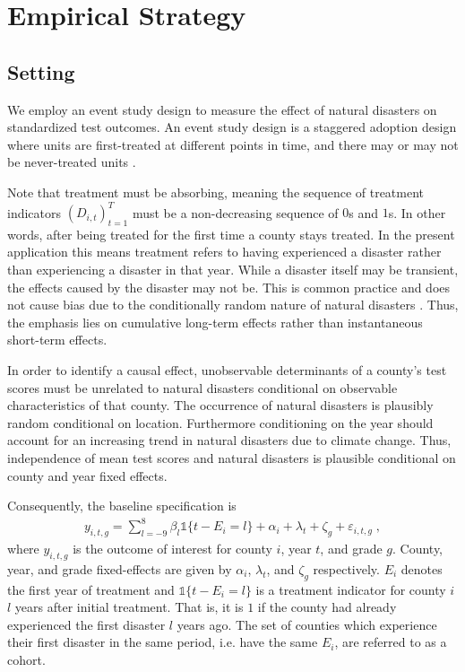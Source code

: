 
\section{Empirical Strategy} \label{EmpStrat}

\subsection{Setting}

We employ an event study design to measure the effect of natural disasters on standardized test outcomes. An event study design is a staggered adoption design where units are first-treated at different points in time, and there may or may not be never-treated units \citep{Sun_2021}.

Note that treatment must be absorbing, meaning the sequence of treatment indicators $(D_{i, t})_{t=1}^T$ must be a non-decreasing sequence of $0$s and $1$s. In other words, after being treated for the first time a county stays treated. In the present application this means treatment refers to having experienced a disaster rather than experiencing a disaster in that year. While a disaster itself may be transient, the effects caused by the disaster may not be. This is common practice and does not cause bias due to the conditionally random nature of natural disasters \citep{Deryugina_2017}. Thus, the emphasis lies on cumulative long-term effects rather than instantaneous short-term effects.

In order to identify a causal effect, unobservable determinants of a county's test scores must be unrelated to natural disasters conditional on observable characteristics of that county. The occurrence of natural disasters is plausibly random conditional on location. Furthermore conditioning on the year should account for an increasing trend in natural disasters due to climate change. Thus, independence of mean test scores and natural disasters is plausible conditional on county and year fixed effects.

Consequently, the baseline specification is
\begin{align} \label{baseline}
	y_{i, t, g} = \sum_{l = -9}^{8} \beta_l \mathds{1}\{t - E_i = l\} + \alpha_i + \lambda_t + \zeta_g + \varepsilon_{i, t, g} \;,
\end{align}
where $y_{i, t, g}$ is the outcome of interest for county $i$, year $t$, and grade $g$. County, year, and grade fixed-effects are given by $\alpha_i$, $\lambda_t$, and $\zeta_g$ respectively. $E_i$ denotes the first year of treatment and $\mathds{1}\{t - E_i = l\}$ is a treatment indicator for county $i$ $l$ years after initial treatment. That is, it is $1$ if the county had already experienced the first disaster $l$ years ago. The set of counties which experience their first disaster in the same period, i.e. have the same $E_i$, are referred to as a cohort.

